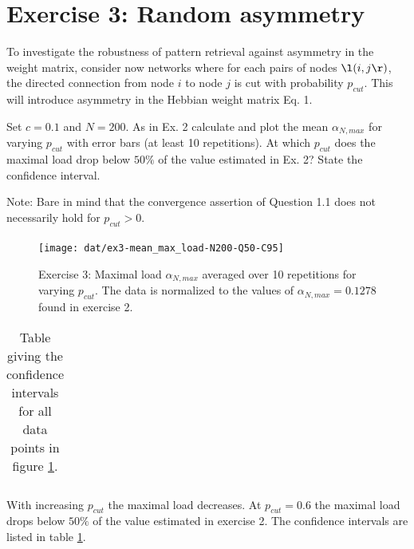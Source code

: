 \section{Exercise 3: Random asymmetry}

\begin{itshape}
\small
To investigate the robustness of pattern retrieval against asymmetry in the weight matrix, consider now networks where for each pairs of nodes $\l(i, j\r)$, the directed connection from node $i$ to node $j$ is cut with probability $p_{cut}$. This will introduce asymmetry in the Hebbian weight matrix Eq. 1.

Set $c=0.1$ and $N = 200$. As in Ex. 2 calculate and plot the mean $\alpha_{N,max}$ for varying $p_{cut}$ with error bars (at least 10 repetitions). At which $p_{cut}$ does the maximal load drop below $50\%$ of the value estimated in Ex. 2? State the confidence interval.

Note: Bare in mind that the convergence assertion of Question 1.1 does not necessarily hold for $p_{cut} > 0$.
\end{itshape}

\paragraph*{}



\begin{figure}[H]
  \vspace{-20pt}
  \begin{center}
    \texttt{[image: dat/ex3-mean\_max\_load-N200-Q50-C95]}
  \end{center}
  \vspace{-20pt}
  \caption{Exercise 3: Maximal load $\alpha_{N,max}$ averaged over 10 repetitions for varying $p_{cut}$. The data is normalized to the values of $\alpha_{N,max}=0.1278$ found in exercise 2. }
  \label{fig:exercise3}
  \vspace{-10pt}
\end{figure}

\begin{table}[H] 
\centering 
\begin{tabular}{|l|l|l|l|l|l|l|l|} 
\hline 
	
\hline
\end{tabular}
\label{tbl:exercise3_CI}
\caption{Table giving the confidence intervals for all data points in figure \ref{fig:exercise3}.}
\end{table} 

With increasing $p_{cut}$ the maximal load decreases. At $p_{cut} = 0.6$ the maximal load drops below $50\%$ of the value estimated in exercise 2. The confidence intervals are listed in table \ref{tbl:exercise3_CI}.

